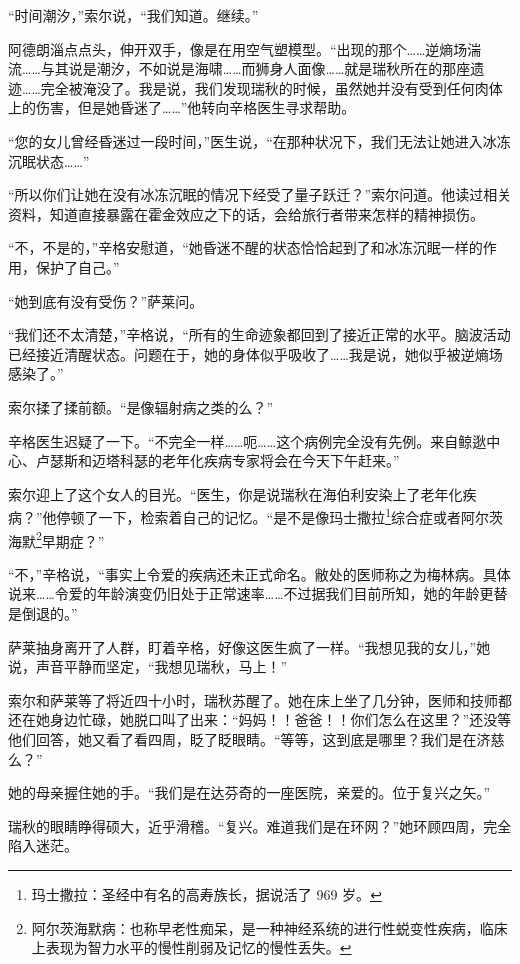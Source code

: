 \documentclass[AutoFakeBold=true]{book}
\begin{document}
``时间潮汐，''索尔说，``我们知道。继续。''

阿德朗淄点点头，伸开双手，像是在用空气塑模型。``出现的那个……逆熵场湍流……与其说是潮汐，不如说是海啸……而狮身人面像……就是瑞秋所在的那座遗迹……完全被淹没了。我是说，我们发现瑞秋的时候，虽然她并没有受到任何肉体上的伤害，但是她昏迷了……''他转向辛格医生寻求帮助。

``您的女儿曾经昏迷过一段时间，''医生说，``在那种状况下，我们无法让她进入冰冻沉眠状态……''

``所以你们让她在没有冰冻沉眠的情况下经受了量子跃迁？''索尔问道。他读过相关资料，知道直接暴露在霍金效应之下的话，会给旅行者带来怎样的精神损伤。

``不，不是的，''辛格安慰道，``她昏迷不醒的状态恰恰起到了和冰冻沉眠一样的作用，保护了自己。''

``她到底有没有受伤？''萨莱问。

``我们还不太清楚，''辛格说，``所有的生命迹象都回到了接近正常的水平。脑波活动已经接近清醒状态。问题在于，她的身体似乎吸收了……我是说，她似乎被逆熵场感染了。''

索尔揉了揉前额。``是像辐射病之类的么？''

辛格医生迟疑了一下。``不完全一样……呃……这个病例完全没有先例。来自鲸逖中心、卢瑟斯和迈塔科瑟的老年化疾病专家将会在今天下午赶来。''

索尔迎上了这个女人的目光。``医生，你是说瑞秋在海伯利安染上了老年化疾病？''他停顿了一下，检索着自己的记忆。``是不是像玛士撒拉\footnote{玛士撒拉：圣经中有名的高寿族长，据说活了 969 岁。}综合症或者阿尔茨海默\footnote{阿尔茨海默病：也称早老性痴呆，是一种神经系统的进行性蜕变性疾病，临床上表现为智力水平的慢性削弱及记忆的慢性丢失。}早期症？''

``不，''辛格说，``事实上令爱的疾病还未正式命名。敝处的医师称之为梅林病。具体说来……令爱的年龄演变仍旧处于正常速率……不过据我们目前所知，她的年龄更替是倒退的。''

萨莱抽身离开了人群，盯着辛格，好像这医生疯了一样。``我想见我的女儿，''她说，声音平静而坚定，``我想见瑞秋，马上！''

\vspace*{1em}

索尔和萨莱等了将近四十小时，瑞秋苏醒了。她在床上坐了几分钟，医师和技师都还在她身边忙碌，她脱口叫了出来：``妈妈！！爸爸！！你们怎么在这里？''还没等他们回答，她又看了看四周，眨了眨眼睛。``等等，这到底是哪里？我们是在济慈么？''

她的母亲握住她的手。``我们是在达芬奇的一座医院，亲爱的。位于复兴之矢。''

瑞秋的眼睛睁得硕大，近乎滑稽。``复兴。难道我们是在环网？''她环顾四周，完全陷入迷茫。
\end{document}
